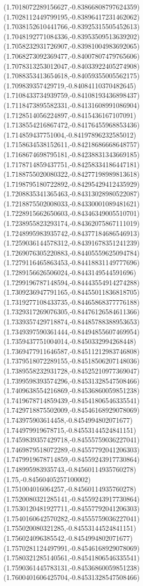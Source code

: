 \documentclass[12pt]{article}
\theoremstyle{plain}
\theoremstyle{definition}
\theoremstyle{remark}
\begin{document}
\begin{figure}
{  (1.7018072289156627,-0.83866808797624359)%
  (1.7028112449799195,-0.83896417231462062)%
  (1.7038152610441766,-0.83925315505452613)%
  (1.7048192771084336,-0.83953509513639202)%
  (1.7058232931726907,-0.83981004983692065)%
  (1.7068273092369477,-0.84007807479765606)%
  (1.7078313253012047,-0.84033922405274908)%
  (1.7088353413654618,-0.84059355005562175)%
  (1.709839357429719,-0.84084110370482645)%
  (1.7108433734939759,-0.84108193436898437)%
  (1.7118473895582331,-0.84131608991086904)%
  (1.7128514056224897,-0.8415436167107091)%
  (1.7138554216867472,-0.84176455968853436)%
  (1.714859437751004,-0.84197896232585012)%
  (1.7158634538152611,-0.84218686668648757)%
  (1.7168674698795181,-0.84238831343669185)%
  (1.7178714859437751,-0.84258334186447181)%
  (1.7188755020080322,-0.84277198989813618)%
  (1.7198795180722892,-0.84295429412435929)%
  (1.7208835341365463,-0.84313028980522087)%
  (1.7218875502008033,-0.84330001089481621)%
  (1.7228915662650603,-0.84346349005510701)%
  (1.7238955823293174,-0.84362075867111019)%
  (1.7248995983935742,-0.84377184686546913)%
  (1.7259036144578312,-0.84391678351241239)%
  (1.7269076305220883,-0.84405559625094784)%
  (1.7279116465863453,-0.84418831149777696)%
  (1.7289156626506024,-0.8443149544591696)%
  (1.7299196787148594,-0.84443554914274288)%
  (1.7309236947791165,-0.84455011836818705)%
  (1.7319277108433735,-0.84465868377776188)%
  (1.7329317269076305,-0.84476126584611366)%
  (1.7339357429718874,-0.84485788388953653)%
  (1.7349397590361444,-0.84494855607469954)%
  (1.7359437751004014,-0.8450332994268448)%
  (1.7369477911646587,-0.84511212983746808)%
  (1.7379518072289155,-0.84518506207148036)%
  (1.7389558232931728,-0.84525210977369047)%
  (1.7399598393574296,-0.84531328547508466)%
  (1.7409638554216869,-0.84536860059851238)%
  (1.7419678714859439,-0.84541806546335541)%
  (1.7429718875502009,-0.84546168929078069)%
  (1.743975903614458,-0.8454994802071677)%
  (1.744979919678715,-0.84553144524841151)%
  (1.7459839357429718,-0.84555759036227041)%
  (1.7469879518072289,-0.84557792041206303)%
  (1.7479919678714859,-0.84559243917730864)%
  (1.748995983935743,-0.84560114935760278)%
  (1.75,-0.84560405257100002)%
  (1.751004016064257,-0.84560114935760278)%
  (1.7520080321285141,-0.84559243917730864)%
  (1.7530120481927711,-0.84557792041206303)%
  (1.7540160642570282,-0.84555759036227041)%
  (1.755020080321285,-0.84553144524841151)%
  (1.756024096385542,-0.8454994802071677)%
  (1.7570281124497991,-0.84546168929078069)%
  (1.7580321285140561,-0.84541806546335541)%
  (1.7590361445783131,-0.84536860059851238)%
  (1.7600401606425704,-0.84531328547508466)%
}
\end{figure}
\end{document}
